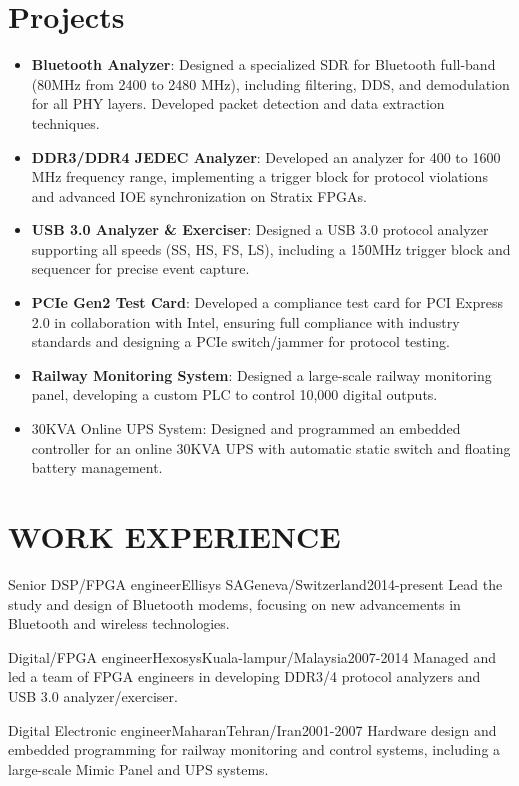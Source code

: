 \documentclass[10pt, a4paper]{article}
\begin{document}
\section{Projects}
\begin{itemize}
    \item \textbf{Bluetooth Analyzer}: Designed a specialized SDR for Bluetooth full-band (80MHz from 2400 to 2480 MHz), including filtering, DDS, and demodulation for all PHY layers. Developed packet detection and data extraction techniques.
    \item \textbf{DDR3/DDR4 JEDEC Analyzer}: Developed an analyzer for 400 to 1600 MHz frequency range, implementing a trigger block for protocol violations and advanced IOE synchronization on Stratix FPGAs.
    \item \textbf{USB 3.0 Analyzer \& Exerciser}: Designed a USB 3.0 protocol analyzer supporting all speeds (SS, HS, FS, LS), including a 150MHz trigger block and sequencer for precise event capture.
    \item \textbf{PCIe Gen2 Test Card}: Developed a compliance test card for PCI Express 2.0 in collaboration with Intel, ensuring full compliance with industry standards and designing a PCIe switch/jammer for protocol testing.
    \item \textbf{Railway Monitoring System}: Designed a large-scale railway monitoring panel, developing a custom PLC to control 10,000 digital outputs. 
    \item 30KVA Online UPS System: Designed and programmed an embedded controller for an online 30KVA UPS with automatic static switch and floating battery management. 
\end{itemize}

\section{WORK EXPERIENCE}
\begin{cvitem}{Senior DSP/FPGA engineer}{Ellisys SA}{Geneva/Switzerland}{2014-present}
   Lead the study and design of Bluetooth modems, focusing on new advancements in Bluetooth and wireless technologies.
\end{cvitem}
\begin{cvitem}{Digital/FPGA engineer}{Hexosys}{Kuala-lampur/Malaysia}{2007-2014}
   Managed and led a team of FPGA engineers in developing DDR3/4 protocol analyzers and USB 3.0 analyzer/exerciser.
\end{cvitem}
\begin{cvitem}{Digital Electronic engineer}{Maharan}{Tehran/Iran}{2001-2007}
   Hardware design and embedded programming for railway monitoring and control systems, including a large-scale Mimic Panel and UPS systems.
\end{cvitem}
\end{document}

